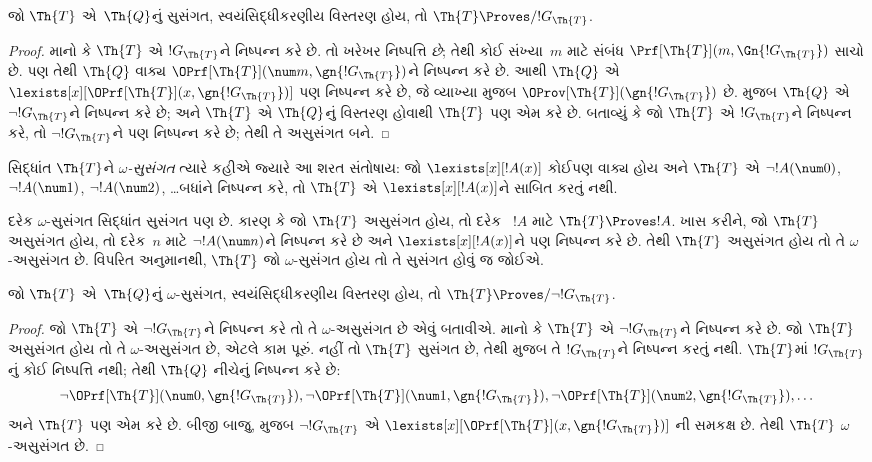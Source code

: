 \begin{lem}
જો $\Th{T}$ એ~$\Th{Q}$નું
સુસંગત,
સ્વયંસિદ્ધીકરણીય વિસ્તરણ
હોય, તો
$\Th{T} \Proves/ !G_\Th{T}$.
\end{lem}

\begin{proof}
માનો કે $\Th{T}$ એ
$!G_\Th{T}$ને નિષ્પન્ન
કરે છે. તો ખરેખર
નિષ્પત્તિ \emph{છે};
તેથી કોઈ સંખ્યા~$m$ માટે
સંબંધ $\Prf[\Th{T}](m,
\Gn{!G_\Th{T}})$ સાચો છે.
પણ તેથી $\Th{Q}$ વાક્ય
$\OPrf[\Th{T}](\num m, \gn{!G_\Th{T}})$ને
નિષ્પન્ન કરે છે.
આથી $\Th{Q}$ એ
$\lexists[x][\OPrf[\Th{T}](x,\gn{!G_\Th{T}})]$
પણ નિષ્પન્ન કરે છે,
જે વ્યાખ્યા મુજબ
$\OProv[\Th{T}](\gn{!G_\Th{T}})$
છે. 
મુજબ $\Th{Q}$ એ
$\lnot !G_\Th{T}$ને
નિષ્પન્ન કરે છે;
અને $\Th{T}$ એ
$\Th{Q}$નું વિસ્તરણ
હોવાથી $\Th{T}$ પણ
એમ કરે છે. બતાવ્યું કે
જો $\Th{T}$ એ
$!G_\Th{T}$ને નિષ્પન્ન
કરે, તો $\lnot !G_\Th{T}$ને
પણ નિષ્પન્ન કરે છે;
તેથી તે અસુસંગત બને.
\end{proof}

\begin{defn}
સિદ્ધાંત $\Th{T}$ને
\emph{$\omega$-સુસંગત}
ત્યારે કહીએ જ્યારે આ
શરત સંતોષાય: જો
$\lexists[x][!A(x)]$
કોઈપણ વાક્ય હોય અને
$\Th{T}$ એ
$\lnot
!A(\num 0)$,
$\lnot !A(\num 1)$,
$\lnot !A(\num 2)$,
\dots બધાંને
નિષ્પન્ન કરે,
તો $\Th{T}$ એ
$\lexists[x][!A(x)]$ને
સાબિત કરતું નથી.
\end{defn}

દરેક $\omega$-સુસંગત
સિદ્ધાંત સુસંગત પણ છે.
કારણ કે જો $\Th{T}$
અસુસંગત હોય, તો દરેક
~$!A$ માટે
$\Th{T} \Proves !A$.
ખાસ કરીને, જો
$\Th{T}$ અસુસંગત હોય,
તો દરેક~$n$ માટે
$\lnot !A(\num n)$ને
નિષ્પન્ન કરે છે અને
$\lexists[x][!A(x)]$ને
પણ નિષ્પન્ન કરે છે.
તેથી $\Th{T}$ અસુસંગત
હોય તો તે
$\omega$-અસુસંગત છે.
વિપરિત અનુમાનથી,
$\Th{T}$ જો
$\omega$-સુસંગત હોય
તો તે સુસંગત હોવું જ
જોઈએ.

\begin{lem}
જો $\Th{T}$ એ~$\Th{Q}$નું
$\omega$-સુસંગત,
સ્વયંસિદ્ધીકરણીય વિસ્તરણ
હોય, તો
$\Th{T} \Proves/ \lnot !G_\Th{T}$.
\end{lem}

\begin{proof}
જો $\Th{T}$ એ
$\lnot !G_\Th{T}$ને
નિષ્પન્ન કરે તો તે
$\omega$-અસુસંગત છે
એવું બતાવીએ. માનો કે
$\Th{T}$ એ
$\lnot !G_\Th{T}$ને
નિષ્પન્ન કરે છે.
જો $\Th{T}$ અસુસંગત
હોય તો તે
$\omega$-અસુસંગત છે,
એટલે કામ પૂરું.
નહીં તો $\Th{T}$
સુસંગત છે, તેથી
મુજબ તે $!G_\Th{T}$ને
નિષ્પન્ન કરતું નથી.
$\Th{T}$માં
$!G_\Th{T}$નું
કોઈ નિષ્પત્તિ નથી;
તેથી $\Th{Q}$ નીચેનું
નિષ્પન્ન કરે છે:
\[
\lnot \OPrf[\Th{T}](\num 0, \gn{!G_\Th{T}}), \lnot \OPrf[\Th{T}](\num 1,
\gn{!G_\Th{T}}), \lnot \OPrf[\Th{T}](\num 2, \gn{!G_\Th{T}}), \dots
\]
અને $\Th{T}$ પણ એમ
કરે છે. બીજી બાજુ,
 મુજબ
$\lnot
!G_\Th{T}$ એ
$\lexists[x][\OPrf[\Th{T}](x,\gn{!G_\Th{T}})]$
ની સમકક્ષ છે. તેથી
$\Th{T}$
$\omega$-અસુસંગત છે.
\end{proof}

